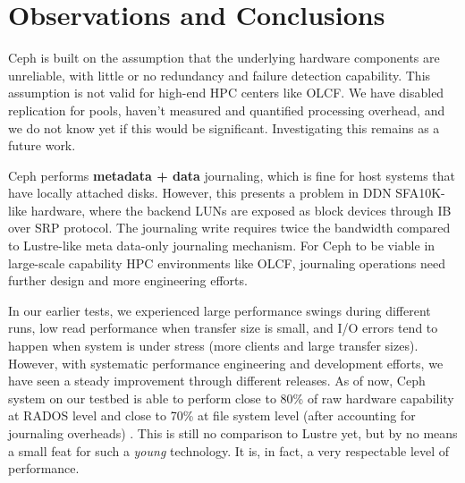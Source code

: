 \section{Observations and Conclusions}
\label{sec:conclusion}

Ceph is built on the assumption that the underlying hardware components are
unreliable, with little or no redundancy and failure detection capability.
This assumption is not valid for high-end HPC centers like OLCF. We have
disabled replication for pools, haven't measured and quantified processing
overhead, and we do not know yet if this would be significant. Investigating
this remains as a future work. 

Ceph performs \textbf{metadata + data} journaling, which is fine for host
systems that have locally attached disks. However, this presents a problem in
DDN SFA10K-like hardware, where the backend LUNs are exposed as block devices
through IB over SRP protocol. The journaling write requires twice the
bandwidth compared to Lustre-like meta data-only journaling mechanism. For
Ceph to be viable in large-scale capability HPC environments like OLCF,
journaling operations need further design and more engineering efforts.

In our earlier tests, we experienced large performance swings during different
runs, low read performance when transfer size is small, and I/O errors tend to
happen when system is under stress (more clients and large transfer sizes).
However, with systematic performance engineering and development efforts, we
have seen a steady improvement through different releases. As of now, Ceph
system on our testbed is able to perform close to 80\% of raw hardware
capability at RADOS level and close to 70\% at file system level (after
accounting for journaling overheads) . This is still no comparison to Lustre
yet, but by no means a small feat for such a \textit{young} technology. It is,
in fact, a very respectable level of performance. 


